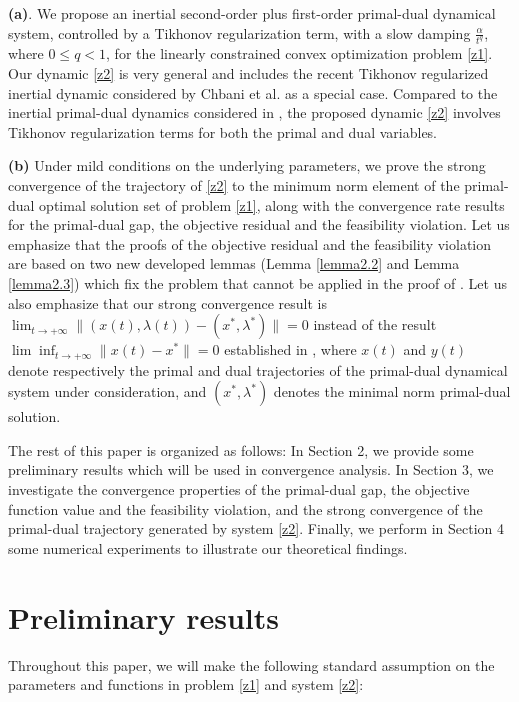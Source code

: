 \documentclass[review]{elsarticle}
\begin{document}
 {\bf (a)}. We  propose an inertial second-order plus first-order primal-dual dynamical system, controlled by a  Tikhonov regularization term, with a slow damping   $\frac{\alpha}{t^q}$, where $0\le q<1$, for  the linearly constrained convex optimization problem  \eqref{z1}. Our dynamic  \eqref{z2} is very general and includes the recent  Tikhonov regularized inertial dynamic considered by  Chbani et al. \cite{ChbaniRBOn(2024)} as a special case.  Compared to the inertial primal-dual dynamics considered in \cite{zhuhufang1,zhuhufang2}, the proposed dynamic \eqref{z2} involves  Tikhonov regularization terms  for both the primal and dual variables.

{\bf (b) } Under mild conditions on the underlying parameters, we prove  the strong convergence  of the trajectory of \eqref{z2}  to the minimum norm element of the primal-dual optimal solution set of problem \eqref{z1}, along with  the convergence rate results for the primal-dual gap, the objective residual and the feasibility violation. Let us emphasize that  the proofs of the objective residual and the feasibility violation are based on two new  developed lemmas (Lemma  \ref{lemma2.2} and Lemma  \ref{lemma2.3}) which fix the problem that  \cite[Lemma 6]{HeHFiietal(2022)} cannot be applied in the proof of \cite[Theorem 3.2]{ChbaniRBOn(2024)}. Let us also emphasize that  our strong convergence result is $\lim_{t\rightarrow+\infty}\|(x(t), \lambda(t))-(x^*,\lambda^*)\|=0$ instead of  the result  $\lim\inf_{t\rightarrow+\infty}\|x(t)-x^*\|=0$ established in  \cite{zhuhufang1,zhuhufang2}, where $x(t)$ and $y(t)$ denote respectively the primal and dual trajectories of the primal-dual dynamical system under consideration, and $(x^*,\lambda^*)$ denotes the minimal norm  primal-dual solution.

	
The rest of this paper is organized as follows: In Section 2, we provide some preliminary results which will be used in convergence analysis. In Section 3,  we investigate the convergence properties of the primal-dual gap, the objective function value and the feasibility violation, and the strong convergence of the primal-dual trajectory generated by system \eqref{z2}. Finally,  we perform  in Section 4 some numerical experiments to illustrate our theoretical findings.
	
	\section{Preliminary results}

Throughout this paper, we will make the following standard assumption on the parameters  and functions in  problem \eqref{z1} and system \eqref{z2}:
\end{document}
